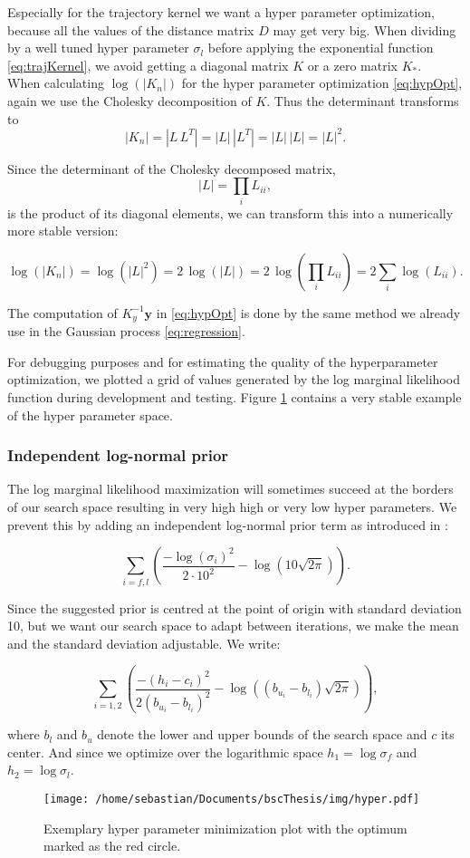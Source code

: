 Especially for the trajectory kernel we want a hyper parameter optimization, because all the values of the distance matrix $D$ may get very big. When dividing by a well tuned hyper parameter $\sigma_l$ before applying the exponential function \eqref{eq:trajKernel}, we avoid getting a diagonal matrix $K$ or a zero matrix $K_*$.\\

When calculating $\log(|K_n|)$ for the hyper parameter optimization \eqref{eq:hypOpt}, again we use the Cholesky decomposition of $K$. Thus the determinant transforms to
$$|K_n|=|L\,L^{T}|=|L|\,|L^{T}|=|L|\,|L|=|L|^{2}.$$

Since the determinant of the Cholesky decomposed matrix,
$$|L| = \textstyle\prod_{i} L_{ii},$$
is the product of its diagonal elements, we can transform this into a numerically more stable version:

$$\log(|K_n|) = \log(|L|^{2}) = 2\,\log(|L|) = 2\,\log(\textstyle\prod_{i} L_{ii}) = 2\textstyle\sum_{i} \log(L_{ii}).$$

The computation of $K_y^{-1}\mathbf{y}$ in \eqref{eq:hypOpt} is done by the same method we already use in the Gaussian process \eqref{eq:regression}.

For debugging purposes and for estimating the quality of the hyperparameter optimization, we plotted a grid of values generated by the log marginal likelihood function during development and testing. Figure \ref{fig:hyp} contains a very stable example of the hyper parameter space.

\subsubsection{Independent log-normal prior}
The log marginal likelihood maximization will sometimes succeed at the borders of our search space resulting in very high high or very low hyper parameters. We prevent this by adding an independent log-normal prior term as introduced in \cite{lizotte2008practical}:

$$\sum_{i=f,l}\left(\frac{-\log(\sigma_i)^2}{2\cdot 10^2} - \log\left(10\sqrt{2\pi}\right) \right).$$

Since the suggested prior is centred at the point of origin with standard deviation 10, but we want our search space to adapt between iterations, we make the mean and the standard deviation adjustable. We write:

$$\sum_{i=1,2}\left(\frac{-(h_i-c_i)^2}{2(b_{u_i}-b_{l_i})^2} - \log\left((b_{u_i}-b_{l_i})\sqrt{2\pi}\right) \right),$$

where $b_l$ and $b_u$ denote the lower and upper bounds of the search space and $c$ its center. And since we optimize over the logarithmic space $h_1 = \log\sigma_f$ and $h_2 = \log\sigma_l$.

\begin{figure}[H]
    \centering
    \texttt{[image: /home/sebastian/Documents/bscThesis/img/hyper.pdf]}
    \caption{Exemplary hyper parameter minimization plot with the optimum marked as the red circle.\label{fig:hyp}}
\end{figure}
